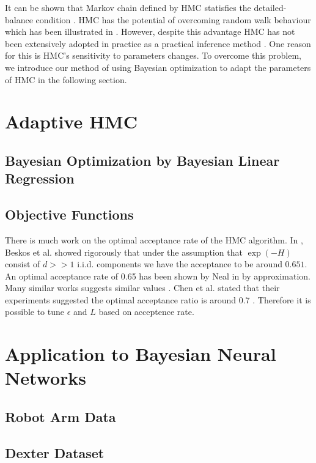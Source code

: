 \documentclass{article} %
\begin{document}
It can be shown that Markov chain defined by HMC statisfies the detailed-balance condition \cite{neal2010mcmc}. HMC has the potential of overcoming random walk behaviour which has been illustrated in \cite{neal2010mcmc, chen2001exploring}. However, despite this advantage HMC has not been extensively adopted in practice as a practical inference method \cite{girolami2011riemann}. One reason for this is HMC's sensitivity to parameters changes. To overcome this problem, we introduce our method of using Bayesian optimization to adapt the parameters of HMC in the following section.


\section{Adaptive HMC}

\subsection{Bayesian Optimization by Bayesian Linear Regression}

\subsection{Objective Functions}
There is much work on the optimal acceptance rate of the HMC algorithm. In \cite{beskos2010optimal}, Beskos et al. showed rigorously that under the assumption that $\exp(-H)$ consist of $d >> 1$ i.i.d. components we have the acceptance to be around $0.651$. An optimal acceptance rate of 0.65 has been shown by Neal in \cite{neal2010mcmc} by approximation. Many similar works suggests similar values \cite{creutz1988global} \cite{sexton1992hamiltonian} \cite{kennedy1991acceptances}. Chen et al. stated that their experiments suggested the optimal acceptance ratio is around 0.7 \cite{chen2001exploring}. Therefore it is possible to tune $\epsilon$ and $L$ based on acceptence rate.


\section{Application to Bayesian Neural Networks}

\subsection{Robot Arm Data}

\subsection{Dexter Dataset}


\small{
{}

}
\end{document}
